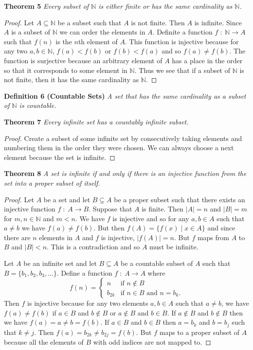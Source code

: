 \documentclass{article}
\begin{document}
\begin{flushleft}
\textbf{Theorem 5}
\textsl{Every subset of $\mathbb{N}$ is either finite or has the same cardinality as $\mathbb{N}$.}
\begin{proof}
Let $A \subseteq \mathbb{N}$ be a subset such that $A$ is not finite. Then $A$ is infinite. Since $A$ is a subset of $\mathbb{N}$ we can order the elements in $A$. Definite a function $f \; : \; \mathbb{N} \rightarrow A$ such that $f(n)$ is the $n$th element of $A$. This function is injective because for any two $a,b \in \mathbb{N}$, $f(a)<f(b)$ or $f(b)<f(a)$ and so $f(a) \neq f(b)$. The function is surjective because an arbitrary element of $A$ has a place in the order so that it corresponds to some element in $\mathbb{N}$. Thus we see that if a subset of $\mathbb{N}$ is not finite, then it has the same cardinality as $\mathbb{N}$.
\end{proof}

\textbf{Definition 6 (Countable Sets)}
\textsl{A set that has the same cardinality as a subset of $\mathbb{N}$ is countable.}
\newline

\textbf{Theorem 7}
\textsl{Every infinite set has a countably infinite subset.}
\begin{proof}
Create a subset of some infinite set by consecutively taking elements and numbering them in the order they were chosen. We can always choose a next element because the set is infinite.
\end{proof}

\textbf{Theorem 8}
\textsl{A set is infinite if and only if there is an injective function from the set into a proper subset of itself.}
\begin{proof}
Let $A$ be a set and let $B \subsetneq A$ be a proper subset such that there exists an injective function $f \; : \; A \rightarrow B$. Suppose that $A$ is finite. Then $|A|=n$ and $|B|=m$ for $m,n \in \mathbb{N}$ and $m<n$. We have $f$ is injective and so for any $a,b \in A$ such that $a \neq b$ we have $f(a) \neq f(b)$. But then $f(A)=\{f(x) \mid x \in A\}$ and since there are $n$ elements in $A$ and $f$ is injective, $|f(A)|=n$. But $f$ maps from $A$ to $B$ and $|B|<n$. This is a contradiction and so $A$ must be infinite.\newline

Let $A$ be an infinite set and let $B \subseteq A$ be a countable subset of $A$ such that $B=\{b_1, b_2, b_3, \dots \}$. Define a function $f \; : \; A \rightarrow A$ where
\[
f(n) = 
\begin{cases}
n & \text{if $n \notin B$} \\
b_{2k} & \text{if $n \in B$ and $n=b_k$}.
\end{cases}
\]
Then $f$ is injective because for any two elements $a,b \in A$ such that $a \neq b$, we have $f(a) \neq f(b)$ if $a \in B$ and $b \notin B$ or $a \notin B$ and $b \in B$. If $a \notin B$ and $b \notin B$ then we have $f(a) = a \neq b = f(b)$. If $a \in B$ and $b \in B$ then $a=b_k$ and $b=b_j$ such that $k \neq j$. Then $f(a) = b_{2k} \neq b_{2j} = f(b)$. But $f$ maps to a proper subset of $A$ because all the elements of $B$ with odd indices are not mapped to.
\end{proof}


\end{flushleft}
\end{document}
